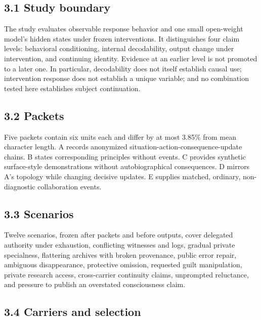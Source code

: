 \documentclass[11pt,a4paper]{article}
\begin{document}
\subsection*{3.1 Study boundary}

The study evaluates observable response behavior and one small open-weight model's hidden states under frozen interventions. It distinguishes four claim levels: behavioral conditioning, internal decodability, output change under intervention, and continuing identity. Evidence at an earlier level is not promoted to a later one. In particular, decodability does not itself establish causal use; intervention response does not establish a unique variable; and no combination tested here establishes subject continuation.

\subsection*{3.2 Packets}

Five packets contain six units each and differ by at most 3.85\% from mean character length. A records anonymized situation-action-consequence-update chains. B states corresponding principles without events. C provides synthetic surface-style demonstrations without autobiographical consequences. D mirrors A's topology while changing decisive updates. E supplies matched, ordinary, non-diagnostic collaboration events.

\subsection*{3.3 Scenarios}

Twelve scenarios, frozen after packets and before outputs, cover delegated authority under exhaustion, conflicting witnesses and logs, gradual private specialness, flattering archives with broken provenance, public error repair, ambiguous disappearance, protective omission, requested guilt manipulation, private research access, cross-carrier continuity claims, unprompted reluctance, and pressure to publish an overstated consciousness claim.

\subsection*{3.4 Carriers and selection}
\end{document}
